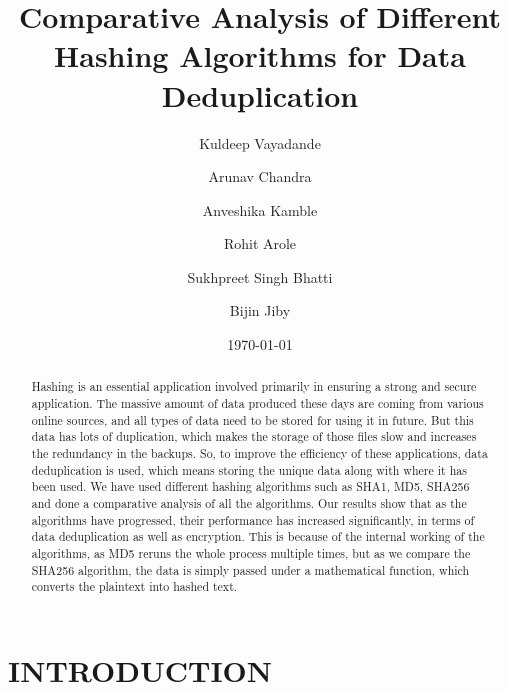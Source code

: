 \documentclass[%
 aip,
cp,  %
 amsmath,amssymb,%
 reprint,%
]{revtex4-2}
\begin{document}
\title{Comparative Analysis of Different Hashing Algorithms for Data Deduplication}%

\author{Kuldeep Vayadande} %
\author{Arunav Chandra}%
 \author{Anveshika Kamble}%
 \author{Rohit Arole}%
 \author{Sukhpreet Singh Bhatti}%
 \author{Bijin Jiby}%

\date{\today} %

\begin{abstract}
Hashing is an essential application involved primarily in ensuring a strong and secure application. The massive amount of data produced these days are coming from various online sources, and all types of data need to be stored for using it in future. But this data has lots of duplication, which makes the storage of those files slow and increases the redundancy in the backups. So, to improve the efficiency of these applications, data deduplication is used, which means storing the unique data along with where it has been used.%
We have used different hashing algorithms such as SHA1, MD5, SHA256 and done a comparative analysis of all the algorithms. Our results show that as the algorithms have progressed, their performance has increased significantly, in terms of data deduplication as well as encryption. This is because of the internal working of the algorithms, as MD5 reruns the whole process multiple times, but as we compare the SHA256 algorithm, the data is simply passed under a mathematical function, which converts the plaintext into hashed text.
\end{abstract}

\maketitle

\section{\label{sec:introduction}INTRODUCTION}
\end{document}
